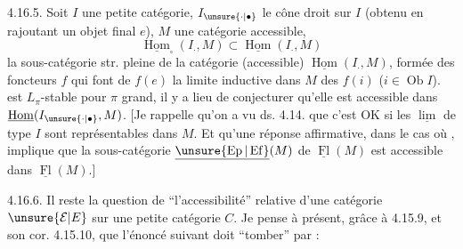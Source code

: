 4.16.5. Soit $I$ une petite catégorie,
$I_{\unsure{\cdot|\bullet}}$ le cône droit sur $I$ (obtenu en rajoutant
un objet final $e$), $M$ une catégorie accessible,
\[
\underline{\operatorname{Hom}}_{\square}(I_{\cdot},M)\subset\underline{\operatorname{Hom}}(I_{\cdot},M)
\]
la sous-catégorie str. pleine de  la catégorie
(accessible) $\underline{\operatorname{Hom}}(I_{\cdot},M)$, formée des foncteurs
$f$ qui font de $f(e)$ la limite inductive
dans $M$ des $f(i)$ ($i\in\operatorname{Ob}I$).  
est $L_\pi$-stable pour $\pi$ grand,  il y a lieu
de conjecturer qu'elle est accessible dans
$\underline{\operatorname{Hom}}(I_{\unsure{\cdot|\bullet}},M)$. [Je rappelle qu'on a vu
ds. 4.14. que c'est OK si les $\underline{\lim}$ de type
$I$ sont représentables dans $M$. Et qu'une
réponse affirmative, dans le cas où
, implique
que la sous-catégorie $\underline{\unsure{\operatorname{Ep}|\operatorname{Ef}}}(M)$ de $\underline{\operatorname{Fl}}(M)$
est accessible dans $\underline{\operatorname{Fl}}(M)$.]

4.16.6. Il reste la question de ``l'accessibilité''
relative d'une catégorie $\unsure{\mathcal E|E}$ sur une
petite catégorie $C$. Je pense à présent,
grâce à 4.15.9, et son cor. 4.15.10, que l'énoncé suivant doit ``tomber'' par  :

